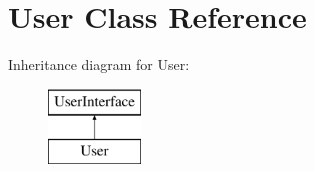\hypertarget{class_app_1_1_entity_1_1_user}{}\section{User Class Reference}
\label{class_app_1_1_entity_1_1_user}
Inheritance diagram for User\+:\begin{figure}[H]
\begin{center}
\leavevmode
\includegraphics[height=2.000000cm]{class_app_1_1_entity_1_1_user}
\end{center}
\end{figure}
